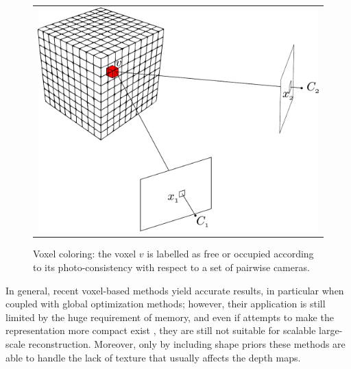 \begin{figure}[t]
\centering
 \begin{tabular}{c}
  \includegraphics[width=0.92\columnwidth]{./img/ch_soa/volumetric}\\
 \end{tabular}
 \caption{Voxel coloring: the voxel $v$ is labelled as free or occupied according to its photo-consistency with respect to a set of pairwise cameras.}
 \label{fig:volumetric}
\end{figure}


In general, recent voxel-based methods yield accurate results, in particular when coupled with global optimization methods; however, their application is still limited by the huge requirement of memory, and even if attempts to make the representation more compact exist \cite{steinbrucker2014volumetric,chen2013scalable,zeng2013octree}, they are still not suitable for scalable large-scale reconstruction.
Moreover, only by including shape priors these methods are able to handle the lack of texture \cite{karimi2015segment} that usually affects the depth maps.



